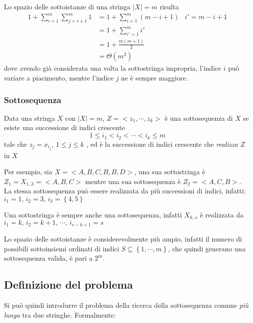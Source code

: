 Lo spazio delle sottoistanze di una stringa $|X|=m$ risulta
\begin{align*}
    1 + \sum_{i=1}^{m} \sum_{j=i+1}^{m} 1 
    &= 
    1 + \sum_{i=1}^{m} \left( m-i+1 \right)
    &
    i'=m-i+1
    \\
    &=
    1 + \sum_{i'=1}^{m} i' 
    \\
    &=
    1 + \frac{m\left( m+1 \right)}{2}
    \\
    &=
    \Theta \left( m^2 \right)
\end{align*}
dove avendo già considerata una volta la sottostringa impropria, l'indice $i$ può variare a piacimento, mentre l'indice $j$ ne è sempre maggiore.

\subsubsection{Sottosequenza}

\begin{definition}[Sottosequenza]
    Data una stringa $X$ con $|X|=m$,
    $Z = < z_1, \cdots, z_k >$ è una sottosequenza di $X$ se esiste una successione di indici crescente
    \[
    1 \leq i_1 < i_2 < \cdots < i_k \leq m
    \]
    tale che 
    $z_j = x_{i_j}$, $1 \leq j \leq k$
    , ed è la successione di indici crescente che \emph{realizza} $Z$ in $X$
    \label{def:sottosequenza}
\end{definition}

Per esempio, sia $X = <A,B,C,B,B,D>$, una sua sottostringa è $Z_1 = X_{1..3} = <A,B,C>$ mentre una sua sottosequenza è $Z_2 = <A,C,B>$. La stessa sottosequenza può essere realizzata da più successioni di indici, infatti: $i_1=1, \, i_2=3, \, i_3=\left\{ 4,5 \right\}$

Una sottostringa è sempre anche una sottosequenza, infatti $X_{k..s}$ è realizzata da $i_1=k, \, i_2=k+1, \, \cdots, \, i_{s-k+1}=s$

Lo spazio delle sottoistanze è considerevolmente più ampio, infatti il numero di possibili sottoinsiemi ordinati di indici $S \subseteq \left\{ 1, \cdots, m \right\}$, che quindi generano una sottosequenza valida, è pari a $2^m$.

\subsection{Definizione del problema}

Si può quindi introdurre il problema della ricerca della sottosequenza comune \emph{più lunga} tra due stringhe. Formalmente:

